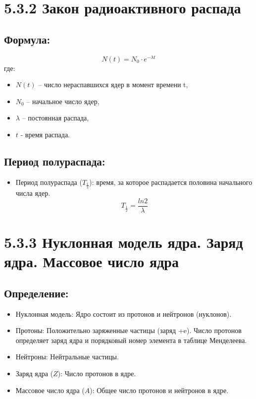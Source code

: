\documentclass[a4paper,12pt]{article}
\begin{document}
\section*{5.3.2 Закон радиоактивного распада}
\vspace{-9pt}
\subsection*{Формула:}
\vspace{-3pt}
\vspace{-0.05em}
$$ N(t) = N_0 \cdot e^{-\lambda t} $$где:
\begin{itemize}[itemsep=0pt, topsep=0pt, parsep=3pt]
        \item $N(t)$ – число нераспавшихся ядер в момент времени t,
        \item $N_0$ – начальное число ядер,
        \item $\lambda$ – постоянная распада,
        \item $t$ - время распада.
\end{itemize}


\vspace{-9pt}
\subsection*{Период полураспада:}
\vspace{-3pt}
\begin{itemize}[itemsep=0pt, topsep=0pt, parsep=3pt]
    \item Период полураспада ($T_{\frac{1}{2}}$): время, за которое распадается половина начального числа ядер.
    \vspace{-0.05em}
    $$ T_{\frac{1}{2}}= \frac{ln2}{\lambda} $$
\end{itemize}

\section*{5.3.3 Нуклонная модель ядра. Заряд ядра. Массовое число ядра}
\vspace{-9pt}
\subsection*{Определение:}
\vspace{-3pt}
\begin{itemize}[itemsep=0pt, topsep=0pt, parsep=3pt]
    \item Нуклонная модель: Ядро состоит из протонов и нейтронов (нуклонов).
    \item Протоны: Положительно заряженные частицы (заряд +e). Число протонов определяет заряд ядра и порядковый номер элемента в таблице Менделеева.
    \item Нейтроны: Нейтральные частицы.
    \item Заряд ядра ($Z$): Число протонов в ядре.
    \item Массовое число ядра ($A$): Общее число протонов и нейтронов в ядре.
\end{itemize}
\end{document}
